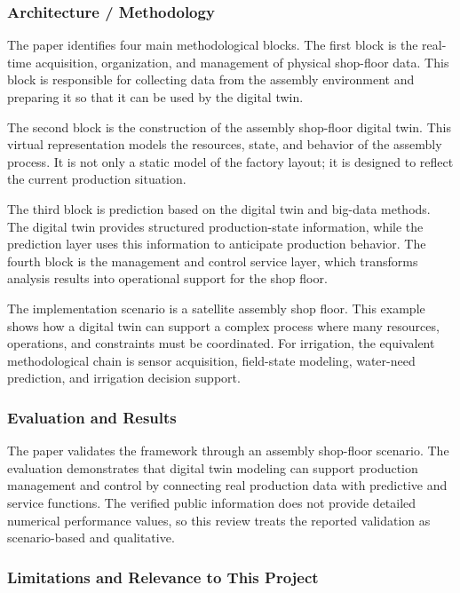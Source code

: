 \subsubsection{Architecture / Methodology}

The paper identifies four main methodological blocks. The first block is the real-time acquisition, organization, and management of physical shop-floor data. This block is responsible for collecting data from the assembly environment and preparing it so that it can be used by the digital twin.

The second block is the construction of the assembly shop-floor digital twin. This virtual representation models the resources, state, and behavior of the assembly process. It is not only a static model of the factory layout; it is designed to reflect the current production situation.

The third block is prediction based on the digital twin and big-data methods. The digital twin provides structured production-state information, while the prediction layer uses this information to anticipate production behavior. The fourth block is the management and control service layer, which transforms analysis results into operational support for the shop floor.

The implementation scenario is a satellite assembly shop floor. This example shows how a digital twin can support a complex process where many resources, operations, and constraints must be coordinated. For irrigation, the equivalent methodological chain is sensor acquisition, field-state modeling, water-need prediction, and irrigation decision support.

\subsubsection{Evaluation and Results}

The paper validates the framework through an assembly shop-floor scenario. The evaluation demonstrates that digital twin modeling can support production management and control by connecting real production data with predictive and service functions. The verified public information does not provide detailed numerical performance values, so this review treats the reported validation as scenario-based and qualitative.

\subsubsection{Limitations and Relevance to This Project}

